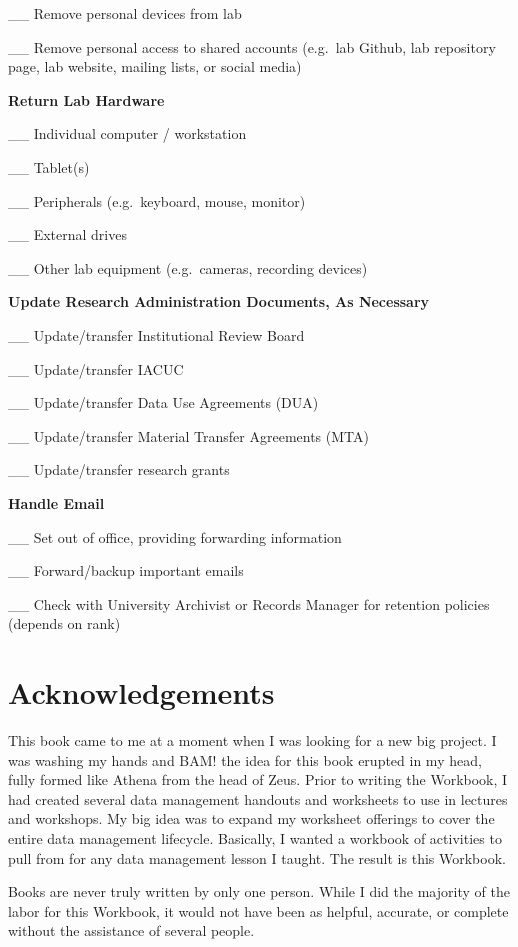 \documentclass[
]{book}
\begin{document}
\_\_ Remove personal devices from lab

\_\_ Remove personal access to shared accounts (e.g.~lab Github, lab repository page, lab website, mailing lists, or social media)

\textbf{Return Lab Hardware}

\_\_ Individual computer / workstation

\_\_ Tablet(s)

\_\_ Peripherals (e.g.~keyboard, mouse, monitor)

\_\_ External drives

\_\_ Other lab equipment (e.g.~cameras, recording devices)

\textbf{Update Research Administration Documents, As Necessary}

\_\_ Update/transfer Institutional Review Board

\_\_ Update/transfer IACUC

\_\_ Update/transfer Data Use Agreements (DUA)

\_\_ Update/transfer Material Transfer Agreements (MTA)

\_\_ Update/transfer research grants

\textbf{Handle Email}

\_\_ Set out of office, providing forwarding information

\_\_ Forward/backup important emails

\_\_ Check with University Archivist or Records Manager for retention policies (depends on rank)

\hypertarget{acknowledgements}{%
\chapter*{Acknowledgements}\label{acknowledgements}}

This book came to me at a moment when I was looking for a new big project. I was washing my hands and BAM! the idea for this book erupted in my head, fully formed like Athena from the head of Zeus. Prior to writing the Workbook, I had created several data management handouts and worksheets to use in lectures and workshops. My big idea was to expand my worksheet offerings to cover the entire data management lifecycle. Basically, I wanted a workbook of activities to pull from for any data management lesson I taught. The result is this Workbook.

Books are never truly written by only one person. While I did the majority of the labor for this Workbook, it would not have been as helpful, accurate, or complete without the assistance of several people.
\end{document}
